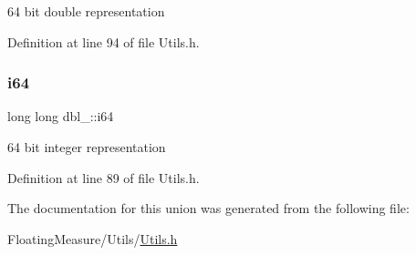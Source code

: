 64 bit double representation 



Definition at line 94 of file Utils.\+h.

\mbox{\label{uniondbl__64_a6f97524990aa26aaa1618b7288301841}} 
\subsubsection{\texorpdfstring{i64}{i64}}
{\footnotesize\ttfamily long long dbl\+\_\+::i64}



64 bit integer representation 



Definition at line 89 of file Utils.\+h.



The documentation for this union was generated from the following file\+:\begin{DoxyCompactItemize}
\item 
Floating\+Measure/\+Utils/\hyperlink{Utils_8h}{Utils.\+h}\end{DoxyCompactItemize}
